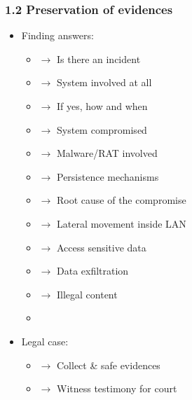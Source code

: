 \begin{frame}
  \frametitle{1.2 Preservation of evidences}
  \begin{itemize}
      \item Finding answers:
      \begin{itemize}
          \item[] $\to$ Is there an incident
          \item[] $\to$ System involved at all
          \item[] $\to$ If yes, how and when
          \item[] $\to$ System compromised
          \item[] $\to$ Malware/RAT involved
          \item[] $\to$ Persistence mechanisms
          \item[] $\to$ Root cause of the compromise
          \item[] $\to$ Lateral movement inside LAN
          \item[] $\to$ Access sensitive data
          \item[] $\to$ Data exfiltration
          \item[] $\to$ Illegal content
          \item[]
      \end{itemize}
      \item Legal case:
      \begin{itemize}
	  \item[] $\to$ Collect \& safe evidences
	  \item[] $\to$ Witness testimony for court
      \end{itemize}
  \end{itemize}
\end{frame}


